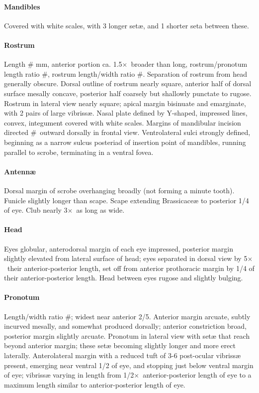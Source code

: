 \documentclass[fleqn,10pt,lineno]{wlpeerj} %
\newcommand{\td}{\textdegree~}
\newcommand{\x}{$\times$~}
\begin{document}
			\paragraph{Mandibles}
				Covered with white scales, with 3 longer set{\ae}, and 1 shorter seta between these.
			\paragraph{Rostrum}
				Length \# mm, anterior portion ca. 1.5\x broader than long, rostrum/pronotum length ratio \#, rostrum length/width ratio \#.
				Separation of rostrum from head generally obscure. 
				Dorsal outline of rostrum nearly square, anterior half of dorsal surface mesally concave, posterior half coarsely but shallowly punctate to rugose. 
				Rostrum in lateral view nearly square; apical margin bisinuate and emarginate, with 2 pairs of large vibriss{\ae}. 
				Nasal plate defined by Y-shaped, impressed lines, convex, integument covered with white scales.
				Margins of mandibular incision directed \#\td outward dorsally in frontal view. 
				Ventrolateral sulci strongly defined, beginning as a narrow sulcus posteriad of insertion point of mandibles, running parallel to scrobe, terminating in a ventral fovea.
			\paragraph{Antenn{\ae}}
				Dorsal margin of scrobe overhanging broadly (not forming a minute tooth).
				Funicle slightly longer than scape.
				Scape extending Brassicace{\ae}  to posterior 1/4 of eye.
				Club nearly 3\x as long as wide.
			\paragraph{Head}
				Eyes globular, anterodorsal margin of each eye impressed, posterior margin slightly elevated from lateral surface of head; eyes separated in dorsal view by 5\x their anterior-posterior length, set off from anterior prothoracic margin by 1/4 of their anterior-posterior length.
				Head between eyes rugose and slightly bulging.
			\paragraph{Pronotum}
				Length/width ratio \#; widest near anterior 2/5.
				Anterior margin arcuate, subtly incurved mesally, and somewhat produced dorsally; anterior constriction broad, posterior margin slightly arcuate.
				Pronotum in lateral view with set{\ae} that reach beyond anterior margin; these set{\ae} becoming slightly longer and more erect laterally.
				Anterolateral margin with a reduced tuft of 3-6 post-ocular vibriss{\ae} present, emerging near ventral 1/2 of eye, and stopping just below ventral margin of eye; vibriss{\ae} varying in length from 1/2\x anterior-posterior length of eye to a maximum length similar to anterior-posterior length of eye.
\end{document}
